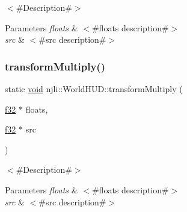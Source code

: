 $<$\#\+Description\#$>$


\begin{DoxyParams}{Parameters}
{\em floats} & $<$\#floats description\#$>$ \\
\hline
{\em src} & $<$\#src description\#$>$ \\
\hline
\end{DoxyParams}
\mbox{\label{classnjli_1_1_world_h_u_d_ac7d1eaae232be02562435aab386470f9}} 
\subsubsection{\texorpdfstring{transform\+Multiply()}{transformMultiply()}\hspace{0.1cm}{\footnotesize\ttfamily [2/2]}}
{\footnotesize\ttfamily static \mbox{\hyperlink{_thread_8h_af1e856da2e658414cb2456cb6f7ebc66}{void}} njli\+::\+World\+H\+U\+D\+::transform\+Multiply (\begin{DoxyParamCaption}\item[{\mbox{\hyperlink{_util_8h_a5f6906312a689f27d70e9d086649d3fd}{f32}} $\ast$}]{floats,  }\item[{\mbox{\hyperlink{_util_8h_a5f6906312a689f27d70e9d086649d3fd}{f32}} $\ast$}]{src }\end{DoxyParamCaption})\hspace{0.3cm}{\ttfamily [static]}}

$<$\#\+Description\#$>$


\begin{DoxyParams}{Parameters}
{\em floats} & $<$\#floats description\#$>$ \\
\hline
{\em src} & $<$\#src description\#$>$ \\
\hline
\end{DoxyParams}
\mbox{\label{classnjli_1_1_world_h_u_d_ad78b88b75910673697709669c9683524}} 
